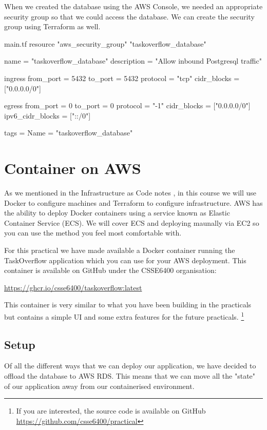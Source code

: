 \documentclass{csse4400}
\begin{document}
When we created the database using the AWS Console,
we needed an appropriate security group so that we could access the database.
We can create the security group using Terraform as well.

\begin{code}[language=terraform,numbers=none]{main.tf}
resource "aws_security_group" "taskoverflow_database" {
  name        = "taskoverflow_database"
  description = "Allow inbound Postgresql traffic"

  ingress {
    from_port        = 5432
    to_port          = 5432
    protocol         = "tcp"
    cidr_blocks      = ["0.0.0.0/0"]
  }

  egress {
    from_port        = 0
    to_port          = 0
    protocol         = "-1"
    cidr_blocks      = ["0.0.0.0/0"]
    ipv6_cidr_blocks = ["::/0"]
  }

  tags = {
    Name = "taskoverflow_database"
  }
}
\end{code}

\section{Container on AWS}

As we mentioned in the Infrastructure as Code notes \cite{iac-notes},
in this course we will use Docker to configure machines and Terraform to configure infrastructure.
AWS has the ability to deploy Docker containers using a service known as Elastic Container Service (ECS).
We will cover ECS and deploying maunally via EC2 so you can use the method you feel most comfortable with.

For this practical we have made available a Docker container running the TaskOverflow application which you can use for your AWS deployment.
This container is available on GitHub under the CSSE6400 organisation:

\url{https://ghcr.io/csse6400/taskoverflow:latest}

This container is very similar to what you have been building in the practicals but contains a simple UI and some extra features for the future practicals.%
\footnote{If you are interested, the source code is available on GitHub \url{https://github.com/csse6400/practical}}

\subsection{Setup}

Of all the different ways that we can deploy our application, we have decided to offload the database to AWS RDS.
This means that we can move all the "state" of our application away from our containerised environment.
\end{document}
